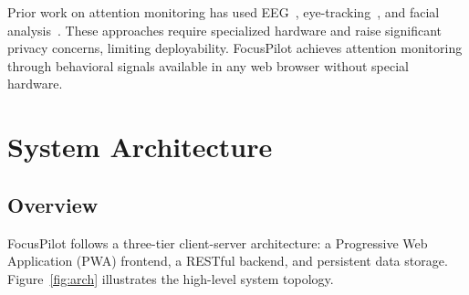 \documentclass[conference]{IEEEtran}
\begin{document}
Prior work on attention monitoring has used EEG~\cite{lubar1995evaluation}, eye-tracking~\cite{carter2005eye}, and facial analysis~\cite{whitehill2014faces}. These approaches require specialized hardware and raise significant privacy concerns, limiting deployability. FocusPilot achieves attention monitoring through behavioral signals available in any web browser without special hardware.

\section{System Architecture}

\subsection{Overview}

FocusPilot follows a three-tier client-server architecture: a Progressive Web Application (PWA) frontend, a RESTful backend, and persistent data storage. Figure~\ref{fig:arch} illustrates the high-level system topology.
\end{document}
